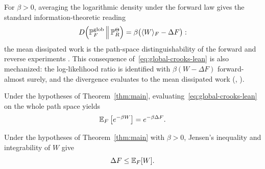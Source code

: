 For $\beta>0$, averaging the logarithmic density under the forward law gives the standard information-theoretic reading
\[
  D\!\left(\mathbb{P}_F^{\mathrm{glob}}\,\middle\|\,\mathbb{P}_R^{\Theta}\right)
  = \beta\bigl(\langle W\rangle_F-\Delta F\bigr):
\]
the mean dissipated work is the path-space distinguishability of the forward and reverse experiments \parencite{KawaiParrondoVandenBroeck2007,Crooks1999,Seifert2012}. This consequence of~\eqref{eq:global-crooks-lean} is also mechanized: the log-likelihood ratio is identified with $\beta(W-\Delta F)$ forward-almost surely, and the divergence evaluates to the mean dissipated work (, ).

\begin{corollary}
Under the hypotheses of Theorem~\ref{thm:main}, evaluating~\eqref{eq:global-crooks-lean} on the whole path space yields
\begin{equation}
\label{eq:jarzynski}
  \mathbb{E}_F\left[e^{-\beta W}\right]=e^{-\beta\Delta F}.
\end{equation}
\end{corollary}

\begin{corollary}
Under the hypotheses of Theorem~\ref{thm:main} with $\beta>0$, Jensen's inequality and integrability of $W$ give
\begin{equation}
\label{eq:second-law}
  \Delta F\le \mathbb{E}_F[W].
\end{equation}
\end{corollary}

